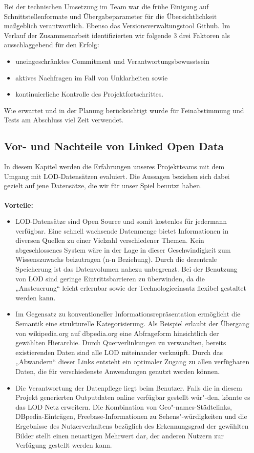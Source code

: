 \documentclass[a4paper, 11pt]{article}
\begin{document}
Bei der technischen Umsetzung im Team war die frühe Einigung auf Schnittstellenformate und Übergabeparameter für die Übersichtlichkeit maßgeblich verantwortlich. Ebenso das Versionsverwaltungstool Github. Im Verlauf der Zusammenarbeit identifizierten wir folgende 3 drei Faktoren als ausschlaggebend für den Erfolg: 
\begin{itemize}
\item uneingeschränktes Commitment und Verantwortungsbewusstsein 
\item aktives Nachfragen im Fall von Unklarheiten sowie 
\item kontinuierliche Kontrolle des Projektfortschrittes.
\end{itemize} 
Wie erwartet und in der Planung berücksichtigt wurde für Feinabstimmung und Tests am Abschluss viel Zeit verwendet. 
\subsection{Vor- und Nachteile von Linked Open Data}
In diesem Kapitel werden die Erfahrungen unseres Projektteams mit dem Umgang mit LOD-Datensätzen evaluiert. Die Aussagen beziehen sich dabei gezielt auf jene Datensätze, die wir für unser Spiel benutzt haben. \\\\
\textbf{Vorteile:}
\begin{itemize}
\item LOD-Datensätze sind Open Source und somit kostenlos für jedermann verfügbar. Eine schnell wachsende Datenmenge bietet Informationen in diversen Quellen zu einer Vielzahl verschiedener Themen. Kein abgeschlossenes System wäre in der Lage in dieser Geschwindigkeit zum Wissenszuwachs beizutragen (n-n Beziehung). Durch die dezentrale Speicherung ist das Datenvolumen nahezu unbegrenzt. Bei der Benutzung von LOD sind geringe Eintrittsbarrieren zu überwinden, da die „Ansteuerung“  leicht erlernbar sowie der Technologieeinsatz flexibel gestaltet werden kann. 
\item Im Gegensatz zu konventioneller Informationsrepräsentation ermöglicht die Semantik eine strukturelle Kategorisierung. Als Beispiel erlaubt der Übergang von wikipedia.org auf dbpedia.org eine Abfrageform hinsichtlich der gewählten Hierarchie.  Durch Querverlinkungen zu verwandten, bereits existierenden Daten sind alle LOD miteinander verknüpft. Durch das „Abwandern“ dieser Links entsteht ein optimaler Zugang zu allen verfügbaren Daten, die für verschiedenste Anwendungen genutzt werden können.
\item Die Verantwortung der Datenpflege liegt beim Benutzer. Falls die in diesem Projekt generierten Outputdaten online verfügbar gestellt wür"-den, könnte es das LOD Netz erweitern. Die Kombination von Geo"-names-Städtelinks, DBpedia-Einträgen, Freebase-Informationen zu Sehens"-würdigkeiten und die Ergebnisse des Nutzerverhaltens bezüglich des Erkennungsgrad der gewählten Bilder stellt einen neuartigen Mehrwert dar, der anderen Nutzern zur Verfügung gestellt werden kann.
\end{itemize}
\end{document}

